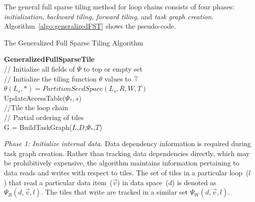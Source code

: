 The general full sparse tiling method for loop chains consists of four phases:
\emph{initialization, backward tiling,} \emph{forward tiling}, and \emph{task graph creation}.  
Algorithm~\ref{algo:generalizedFST} shows the pseudo-code.

\begin{algorithm}[t]
\caption{The Generalized Full Sparse Tiling Algorithm}
\label{algo:generalizedFST}
\textbf{GeneralizedFullSparseTile}\\
  \KwData{$\Psi_*$}
// Initialize all fields of $\Psi$ to top or empty set \\
// Initialize the tiling function $\theta$ values to $\top$ \\
$\theta(L_{s},*) = PartitionSeedSpace(L_{s}, R, W, T) $\\
UpdateAccessTable($\Psi_*,s$)\\
//Tile the loop chain \\
//  Partial ordering of tiles\\
G = BuildTaskGraph($L$,$D$,$\Psi_*$,$T$)
\end{algorithm}



\emph{Phase 1: Initialize internal data.}
Data dependency information is required during task graph creation.
Rather than tracking data dependencies directly, which may be 
prohibitively expensive, the algorithm maintains information pertaining to 
data reads and writes with respect to tiles.
The set of tiles in a particular loop~($l$) that read a particular data item~($\vec{v}$) in 
data space~($d$) is denoted as $\Psi_R(d,\vec{v},l)$.
The tiles that write are tracked in a similar set $\Psi_W(d,\vec{v},l)$.

